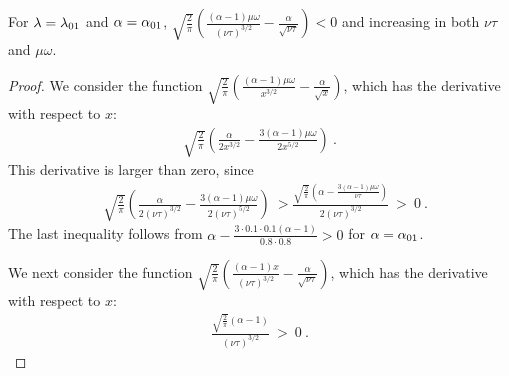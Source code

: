 \documentclass{article}
\begin{document}
\begin{lemma}
\label{lem:F3}

For $\lambda=\lambda_{\rm 01}$ and $\alpha=\alpha_{\rm 01}$,
 $\sqrt{\frac{2}{\pi }} \left(\frac{(\alpha -1) \mu\omega}{(\nu \tau)^{3/2}} - 
 \frac{\alpha }{\sqrt{\nu \tau}}\right)<0$
and increasing in both $\nu \tau$ and $\mu \omega$.
\end{lemma}
\begin{proof}
We consider the function
    $\sqrt{\frac{2}{\pi }} \left(\frac{(\alpha -1) \mu
    \omega}{x^{3/2}}-\frac{\alpha }{\sqrt{x}}\right)$, 
which has the derivative with respect to $x$:
\begin{align}
\sqrt{\frac{2}{\pi }} \left(\frac{\alpha }{2 x^{3/2}}-\frac{3 (\alpha
  -1) \mu \omega}{2 x^{5/2}}\right) \ .
\end{align}
This derivative is larger than zero, since 
\begin{align}
&\sqrt{\frac{2}{\pi }} \left(\frac{\alpha }{2 (\nu \tau)^{3/2}}-\frac{3 (\alpha -1) \mu \omega}{2 (\nu \tau)^{5/2}}\right)
\ > \frac{\sqrt{\frac{2}{\pi }} \left(\alpha -\frac{3 (\alpha -1)
  \mu \omega}{\nu \tau}\right)}{2 (\nu
  \tau)^{3/2}} \ > \ 0 \ .
\end{align}
The last inequality follows from 
$\alpha -\frac{3 \cdot 0.1 \cdot 0.1(\alpha -1) }{0.8 \cdot 0.8}>0$ for $\alpha=\alpha_{\rm 01}$.

We next consider the function
$\sqrt{\frac{2}{\pi }} \left(\frac{(\alpha -1) x}{(\nu \tau)^{3/2}}-\frac{\alpha }{\sqrt{\nu \tau}}\right)$,
which  has the derivative with respect to $x$:
\begin{align}
\frac{\sqrt{\frac{2}{\pi }} (\alpha -1)}{(\nu \tau)^{3/2}}
  \ > \ 0 \ .
\end{align}
\end{proof}
\end{document}
